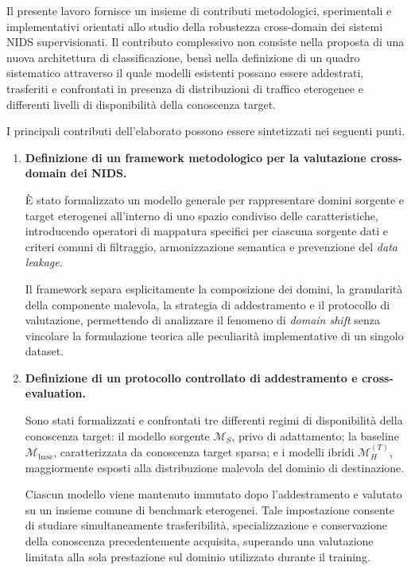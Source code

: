 Il presente lavoro fornisce un insieme di contributi metodologici, sperimentali e implementativi orientati allo studio della robustezza cross-domain dei sistemi NIDS supervisionati. 
Il contributo complessivo non consiste nella proposta di una nuova architettura di classificazione, bensì nella definizione di un quadro sistematico attraverso il quale modelli esistenti possano essere addestrati, trasferiti e confrontati in presenza di distribuzioni di traffico eterogenee e differenti livelli di disponibilità della conoscenza target.

I principali contributi dell'elaborato possono essere sintetizzati nei seguenti punti.

\begin{enumerate}

    \item \textbf{Definizione di un framework metodologico per la valutazione cross-domain dei NIDS.}
    
    È stato formalizzato un modello generale per rappresentare domini sorgente e target eterogenei all'interno di uno spazio condiviso delle caratteristiche, introducendo operatori di mappatura specifici per ciascuna sorgente dati e criteri comuni di filtraggio, armonizzazione semantica e prevenzione del \textit{data leakage}.
    
    Il framework separa esplicitamente la composizione dei domini, la granularità della componente malevola, la strategia di addestramento e il protocollo di valutazione, permettendo di analizzare il fenomeno di \textit{domain shift} senza vincolare la formulazione teorica alle peculiarità implementative di un singolo dataset.

    \item \textbf{Definizione di un protocollo controllato di addestramento e cross-evaluation.}
    
    Sono stati formalizzati e confrontati tre differenti regimi di disponibilità della conoscenza target: il modello sorgente $\mathcal{M}_{S}$, privo di adattamento; la baseline $\mathcal{M}_{\mathrm{base}}$, caratterizzata da conoscenza target sparsa; e i modelli ibridi $\mathcal{M}_{H}^{(T)}$, maggiormente esposti alla distribuzione malevola del dominio di destinazione.
    
    Ciascun modello viene mantenuto immutato dopo l'addestramento e valutato su un insieme comune di benchmark eterogenei. 
    Tale impostazione consente di studiare simultaneamente trasferibilità, specializzazione e conservazione della conoscenza precedentemente acquisita, superando una valutazione limitata alla sola prestazione sul dominio utilizzato durante il training.


\end{enumerate}
